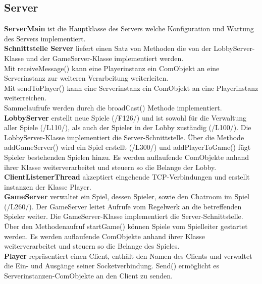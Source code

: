 \documentclass{article}
\begin{document}
	\subsection{Server}
		\textbf{ServerMain} ist die Hauptklasse des Servers welche Konfiguration und Wartung des Servers implementiert. \\
		\textbf{Schnittstelle Server} liefert einen Satz von Methoden die von der LobbyServer-Klasse und der GameServer-Klasse implementiert werden. \\
		Mit receiveMessage() kann eine Playerinstanz ein ComObjekt an eine Serverinstanz zur weiteren Verarbeitung weiterleiten. \\
		Mit sendToPlayer() kann eine Serverinstanz ein ComObjekt an eine Playerinstanz weiterreichen. \\
		Sammelaufrufe werden durch die broadCast() Methode implementiert.
		\textbf{LobbyServer} erstellt neue Spiele (/F126/) und ist sowohl für die Verwaltung aller Spiele (/L110/), als auch der Spieler in der Lobby zuständig (/L100/). Die LobbyServer-Klasse implementiert die Server-Schnittstelle. Über die Methode addGameServer() wird ein Spiel erstellt (/L300/) und addPlayerToGame() fügt Spieler bestehenden Spielen hinzu. Es werden auflaufende ComObjekte anhand ihrer Klasse weiterverarbeitet und steuern so die Belange der Lobby. \\
		\textbf{ClientListenerThread} akzeptiert eingehende TCP-Verbindungen und erstellt instanzen der Klasse Player. \\
		\textbf{GameServer} verwaltet ein Spiel, dessen Spieler, sowie den Chatroom im Spiel (/L260/). Der GameServer leitet Aufrufe vom Regelwerk an die betreffenden Spieler weiter. Die GameServer-Klasse implementiert die Server-Schnittstelle. Über den Methodenaufruf startGame() können Spiele vom Spielleiter gestartet werden. Es werden auflaufende ComObjekte anhand ihrer Klasse weiterverarbeitet und steuern so die Belange des Spieles.\\
		\textbf{Player} repräsentiert einen Client, enthält den Namen des Clients und verwaltet die Ein- und Ausgänge seiner Socketverbindung. Send() ermöglicht es Serverinstanzen-ComObjekte an den Client zu senden. \\
\end{document}

